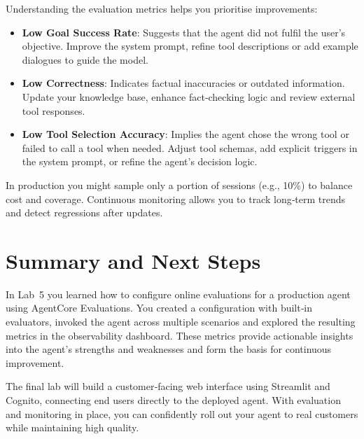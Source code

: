 Understanding the evaluation metrics helps you prioritise improvements:

\begin{itemize}
  \item \textbf{Low Goal Success Rate}: Suggests that the agent did not
    fulfil the user’s objective.  Improve the system prompt,
    refine tool descriptions or add example dialogues to guide the
    model.
  \item \textbf{Low Correctness}: Indicates factual inaccuracies or
    outdated information.  Update your knowledge base, enhance
    fact‑checking logic and review external tool responses.
  \item \textbf{Low Tool Selection Accuracy}: Implies the agent chose
    the wrong tool or failed to call a tool when needed.  Adjust
    tool schemas, add explicit triggers in the system prompt, or
    refine the agent’s decision logic.
\end{itemize}

In production you might sample only a portion of sessions (e.g., 10\%)
to balance cost and coverage.  Continuous monitoring allows you to
track long‑term trends and detect regressions after updates.

\section{Summary and Next Steps}

In Lab 5 you learned how to configure online evaluations for a
production agent using AgentCore Evaluations.  You created a
configuration with built‑in evaluators, invoked the agent across
multiple scenarios and explored the resulting metrics in the
observability dashboard.  These metrics provide actionable insights
into the agent’s strengths and weaknesses and form the basis for
continuous improvement.

The final lab will build a customer‑facing web interface using
Streamlit and Cognito, connecting end users directly to the deployed
agent.  With evaluation and monitoring in place, you can confidently
roll out your agent to real customers while maintaining high quality.

